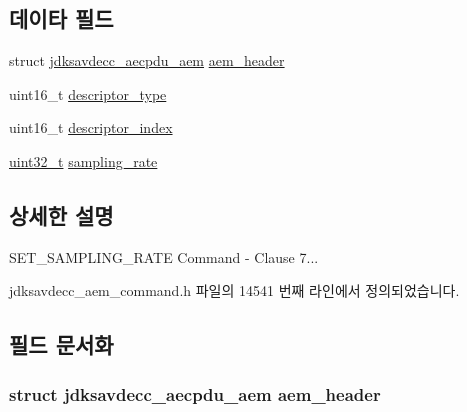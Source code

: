 \subsection*{데이타 필드}
\begin{DoxyCompactItemize}
\item 
struct \hyperlink{structjdksavdecc__aecpdu__aem}{jdksavdecc\+\_\+aecpdu\+\_\+aem} \hyperlink{structjdksavdecc__aem__command__set__sampling__rate_ae1e77ccb75ff5021ad923221eab38294}{aem\+\_\+header}
\item 
uint16\+\_\+t \hyperlink{structjdksavdecc__aem__command__set__sampling__rate_ab7c32b6c7131c13d4ea3b7ee2f09b78d}{descriptor\+\_\+type}
\item 
uint16\+\_\+t \hyperlink{structjdksavdecc__aem__command__set__sampling__rate_a042bbc76d835b82d27c1932431ee38d4}{descriptor\+\_\+index}
\item 
\hyperlink{parse_8c_a6eb1e68cc391dd753bc8ce896dbb8315}{uint32\+\_\+t} \hyperlink{structjdksavdecc__aem__command__set__sampling__rate_ab17c387eb7798bbb74ccfedd6f4cf21b}{sampling\+\_\+rate}
\end{DoxyCompactItemize}


\subsection{상세한 설명}
S\+E\+T\+\_\+\+S\+A\+M\+P\+L\+I\+N\+G\+\_\+\+R\+A\+TE Command -\/ Clause 7... 

jdksavdecc\+\_\+aem\+\_\+command.\+h 파일의 14541 번째 라인에서 정의되었습니다.



\subsection{필드 문서화}
\subsubsection[{\texorpdfstring{aem\+\_\+header}{aem_header}}]{\setlength{\rightskip}{0pt plus 5cm}struct {\bf jdksavdecc\+\_\+aecpdu\+\_\+aem} aem\+\_\+header}\hypertarget{structjdksavdecc__aem__command__set__sampling__rate_ae1e77ccb75ff5021ad923221eab38294}{}\label{structjdksavdecc__aem__command__set__sampling__rate_ae1e77ccb75ff5021ad923221eab38294}



